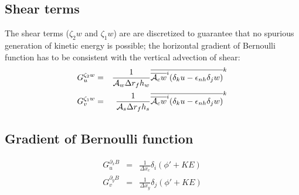 \subsection{Shear terms}

The shear terms ($\zeta_2w$ and $\zeta_1w$) are are discretized to
guarantee that no spurious generation of kinetic energy is possible;
the horizontal gradient of Bernoulli function has to be consistent
with the vertical advection of shear:
\begin{eqnarray}
G_u^{\zeta_2 w} & = &
\frac{1}{ {\cal A}_w \Delta r_f h_w } \overline{
\overline{ {\cal A}_c w }^i ( \delta_k u - \epsilon_{nh} \delta_j w )
}^k \\
G_v^{\zeta_1 w} & = &
\frac{1}{ {\cal A}_s \Delta r_f h_s } \overline{
\overline{ {\cal A}_c w }^i ( \delta_k u - \epsilon_{nh} \delta_j w )
}^k
\end{eqnarray}




\subsection{Gradient of Bernoulli function}

\begin{eqnarray}
G_u^{\partial_x B} & = &
\frac{1}{\Delta x_c} \delta_i ( \phi' + KE ) \\
G_v^{\partial_y B} & = &
\frac{1}{\Delta x_y} \delta_j ( \phi' + KE )
\end{eqnarray}




